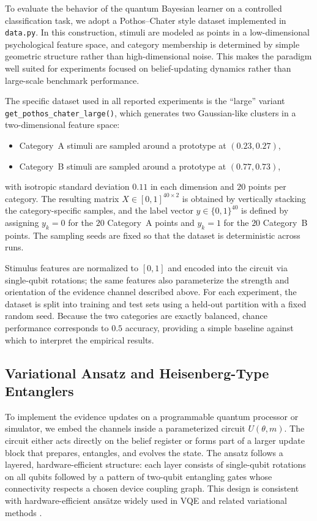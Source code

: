 \documentclass[conference]{IEEEtran}
\begin{document}
To evaluate the behavior of the quantum Bayesian learner on a controlled classification task, 
we adopt a Pothos--Chater style dataset \cite{b19} implemented in \texttt{data.py}. In this construction, 
stimuli are modeled as points in a low-dimensional psychological feature space, and category membership is determined by simple geometric structure rather than high-dimensional noise. This makes the paradigm well suited for experiments focused on belief-updating dynamics rather than large-scale benchmark performance.

The specific dataset used in all reported experiments is the ``large'' variant
\texttt{get\_pothos\_chater\_large()}, which generates two Gaussian-like clusters in a two-dimensional
feature space:
\begin{itemize}
    \item Category~A stimuli are sampled around a prototype at $(0.23, 0.27)$,
    \item Category~B stimuli are sampled around a prototype at $(0.77, 0.73)$,
\end{itemize}
with isotropic standard deviation $0.11$ in each dimension and $20$ points per category. The resulting
matrix $X \in [0,1]^{40 \times 2}$ is obtained by vertically stacking the category-specific samples, and the label vector $y \in \{0,1\}^{40}$ is defined by assigning $y_k = 0$ for the $20$ Category~A points and $y_k = 1$ for the $20$ Category~B points. The sampling seeds are fixed so that the dataset is deterministic across runs. 

Stimulus features are normalized to $[0,1]$ and encoded into the circuit via single-qubit rotations; the same features also parameterize the strength and orientation of the evidence channel described above. For each experiment, the dataset is split into training and test sets using a held-out partition with a fixed random seed. Because the two categories are exactly balanced, chance performance corresponds to $0.5$ accuracy, providing a simple baseline against which to interpret the empirical results.

\subsection{Variational Ansatz and Heisenberg-Type Entanglers}

To implement the evidence updates on a programmable quantum processor or simulator, we embed the channels inside a parameterized circuit $U(\theta, m)$. The circuit either acts directly on the belief register or forms part of a larger update block that prepares, entangles, and evolves the state. The ansatz follows a layered, hardware-efficient structure: each layer consists of single-qubit rotations on all qubits followed by a pattern of two-qubit entangling gates whose connectivity respects a chosen device coupling graph. This design is consistent with hardware-efficient ansätze widely used in VQE and related variational methods \cite{b4,b5,b6}.
\end{document}
